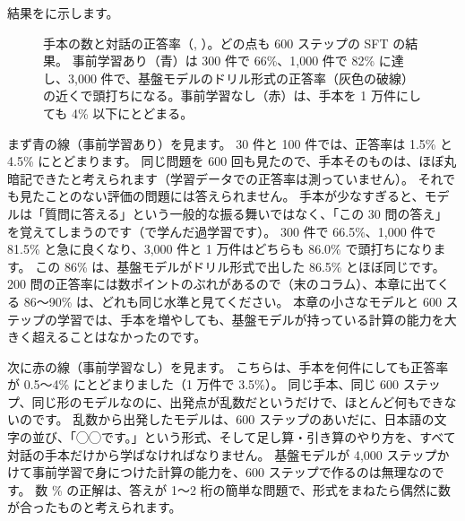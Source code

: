 結果をに示します。

\begin{figure}[tbp]
\centering
{}
\caption{手本の数と対話の正答率（, ）。どの点も 600 ステップの SFT の結果。
事前学習あり（青）は 300 件で 66\%、1,000 件で 82\% に達し、3,000 件で、基盤モデルのドリル形式の正答率（灰色の破線）の近くで頭打ちになる。事前学習なし（赤）は、手本を 1 万件にしても 4\% 以下にとどまる。}
\label{fig:post-sft-data}
\end{figure}

まず青の線（事前学習あり）を見ます。
30 件と 100 件では、正答率は 1.5\% と 4.5\% にとどまります。
同じ問題を 600 回も見たので、手本そのものは、ほぼ丸暗記できたと考えられます（学習データでの正答率は測っていません）。
それでも見たことのない評価の問題には答えられません。
手本が少なすぎると、モデルは「質問に答える」という一般的な振る舞いではなく、「この 30 問の答え」を覚えてしまうのです（で学んだ過学習です）。
300 件で 66.5\%、1,000 件で 81.5\% と急に良くなり、3,000 件と 1 万件はどちらも 86.0\% で頭打ちになります。
この 86\% は、基盤モデルがドリル形式で出した 86.5\% とほぼ同じです。
200 問の正答率には数ポイントのぶれがあるので（末のコラム）、本章に出てくる 86〜90\% は、どれも同じ水準と見てください。
本章の小さなモデルと 600 ステップの学習では、手本を増やしても、基盤モデルが持っている計算の能力を大きく超えることはなかったのです。

次に赤の線（事前学習なし）を見ます。
こちらは、手本を何件にしても正答率が 0.5〜4\% にとどまりました（1 万件で 3.5\%）。
同じ手本、同じ 600 ステップ、同じ形のモデルなのに、出発点が乱数だというだけで、ほとんど何もできないのです。
乱数から出発したモデルは、600 ステップのあいだに、日本語の文字の並び、「◯◯です。」という形式、そして足し算・引き算のやり方を、すべて対話の手本だけから学ばなければなりません。
基盤モデルが 4,000 ステップかけて事前学習で身につけた計算の能力を、600 ステップで作るのは無理なのです。
数 \% の正解は、答えが 1〜2 桁の簡単な問題で、形式をまねたら偶然に数が合ったものと考えられます。

